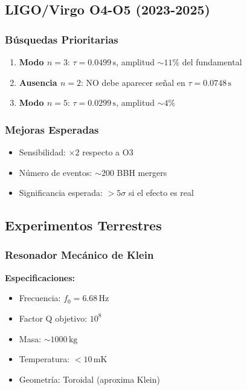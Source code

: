 \documentclass[12pt,a4paper]{article}
\begin{document}
\subsection{LIGO/Virgo O4-O5 (2023-2025)}

\subsubsection{Búsquedas Prioritarias}

\begin{enumerate}
    \item \textbf{Modo $n=3$}: $\tau = 0.0499\,\mathrm{s}$, amplitud $\sim 11\%$ del fundamental
    \item \textbf{Ausencia $n=2$}: NO debe aparecer señal en $\tau = 0.0748\,\mathrm{s}$
    \item \textbf{Modo $n=5$}: $\tau = 0.0299\,\mathrm{s}$, amplitud $\sim 4\%$
\end{enumerate}

\subsubsection{Mejoras Esperadas}

\begin{itemize}
    \item Sensibilidad: $\times 2$ respecto a O3
    \item Número de eventos: $\sim 200$ BBH mergers
    \item Significancia esperada: $>5\sigma$ si el efecto es real
\end{itemize}

\subsection{Experimentos Terrestres}

\subsubsection{Resonador Mecánico de Klein}

\textbf{Especificaciones:}
\begin{itemize}
    \item Frecuencia: $f_0 = 6.68\,\mathrm{Hz}$
    \item Factor Q objetivo: $10^8$
    \item Masa: $\sim 1000\,\mathrm{kg}$
    \item Temperatura: $< 10\,\mathrm{mK}$
    \item Geometría: Toroidal (aproxima Klein)
\end{itemize}
\end{document}
